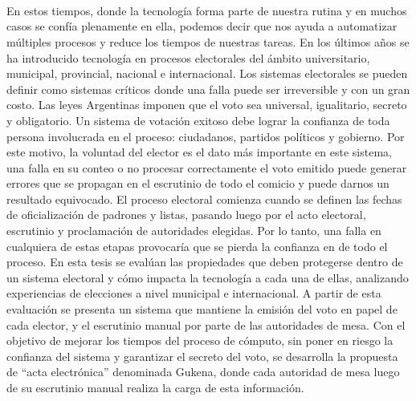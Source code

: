 \ \\
\ \\
\label{pagresum}
\\
\ \\
\ \\

\ \\

\ \\
\ \\

 En estos tiempos, donde la tecnología forma parte de nuestra rutina y en muchos casos se confía plenamente en ella, podemos decir que nos ayuda a automatizar múltiples procesos y reduce los tiempos de nuestras tareas. En los últimos años se ha introducido tecnología en procesos electorales del ámbito universitario, municipal, provincial, nacional e internacional. Los sistemas electorales se pueden definir como sistemas críticos donde una falla puede ser irreversible y con un gran costo. Las leyes Argentinas imponen que el voto sea universal, igualitario, secreto y obligatorio. Un sistema de votación exitoso debe lograr la confianza de toda persona involucrada en el proceso: ciudadanos, partidos políticos y gobierno. Por este motivo, la voluntad del elector es el dato más importante en este sistema, una falla en su conteo o no procesar correctamente el voto emitido puede generar errores que se propagan en el escrutinio de todo el comicio y puede darnos un resultado equivocado.\newline
 El proceso electoral comienza cuando se definen las fechas de oficialización de padrones y listas, pasando luego por el acto electoral, escrutinio y proclamación de autoridades elegidas. Por lo tanto, una falla en cualquiera de estas etapas provocaría que se pierda la confianza en de todo el proceso.\newline
 En esta tesis se evalúan las propiedades que deben protegerse dentro de un sistema electoral y cómo impacta la tecnología a cada una de ellas, analizando experiencias de elecciones a nivel municipal e internacional. A partir de esta evaluación se presenta un sistema que mantiene la emisión del voto en papel de cada elector, y el escrutinio manual por parte de las autoridades de mesa. Con el objetivo de mejorar los tiempos del proceso de cómputo, sin poner en riesgo la confianza del sistema y garantizar el secreto del voto, se desarrolla la propuesta de ``acta electrónica'' denominada Gukena, donde cada autoridad de mesa luego de su escrutinio manual realiza la carga de esta información.\newline
